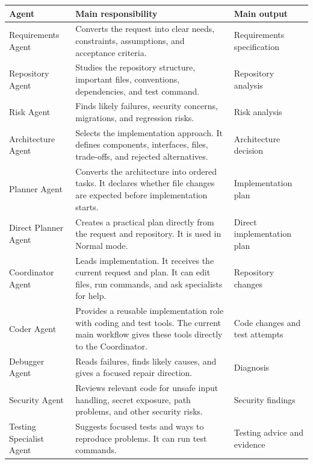 \documentclass[11pt,a4paper]{article}
\begin{document}
\begin{table}[H]
\centering
\small
\begin{tabularx}{\textwidth}{L{0.23\textwidth}Y Y}
\toprule
\textbf{Agent} & \textbf{Main responsibility} & \textbf{Main output} \\
\midrule
Requirements Agent & Converts the request into clear needs, constraints, assumptions, and acceptance criteria. & Requirements specification \\

Repository Agent & Studies the repository structure, important files, conventions, dependencies, and test command. & Repository analysis \\

Risk Agent & Finds likely failures, security concerns, migrations, and regression risks. & Risk analysis \\

Architecture Agent & Selects the implementation approach. It defines components, interfaces, files, trade-offs, and rejected alternatives. & Architecture decision \\

Planner Agent & Converts the architecture into ordered tasks. It declares whether file changes are expected before implementation starts. & Implementation plan \\

Direct Planner Agent & Creates a practical plan directly from the request and repository. It is used in Normal mode. & Direct implementation plan \\

Coordinator Agent & Leads implementation. It receives the current request and plan. It can edit files, run commands, and ask specialists for help. & Repository changes \\

Coder Agent & Provides a reusable implementation role with coding and test tools. The current main workflow gives these tools directly to the Coordinator. & Code changes and test attempts \\

Debugger Agent & Reads failures, finds likely causes, and gives a focused repair direction. & Diagnosis \\

Security Agent & Reviews relevant code for unsafe input handling, secret exposure, path problems, and other security risks. & Security findings \\

Testing Specialist Agent & Suggests focused tests and ways to reproduce problems. It can run test commands. & Testing advice and evidence \\


\end{tabularx}
\end{table}
\end{document}
